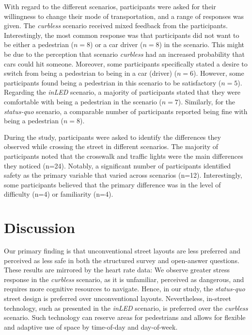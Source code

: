 With regard to the different scenarios, participants were asked for their willingness to change their mode of transportation, and a range of responses was given. 
The \emph{curbless} scenario received mixed feedback from the participants. Interestingly, the most common response was that participants did not want to be either a pedestrian ($n=8$) or a car driver ($n=8$) in the scenario. This might be due to the perception that scenario \emph{curbless} had an increased probability that cars could hit someone. Moreover, some participants specifically stated a desire to switch from being a pedestrian to being in a car (driver) ($n=6$). However, some participants found being a pedestrian in this scenario to be satisfactory ($n=5$).
Regarding the \emph{inLED} scenario, a majority of participants stated that they were comfortable with being a pedestrian in the scenario ($n=7$). Similarly, for the \emph{status-quo} scenario, a comparable number of participants reported being fine with being a pedestrian ($n=8$).

During the study, participants were asked to identify the differences they observed while crossing the street in different scenarios. The majority of participants noted that the crosswalk and traffic lights were the main differences they noticed (n=24). Notably, a significant number of participants identified safety as the primary variable that varied across scenarios (n=12). Interestingly, some participants believed that the primary difference was in the level of difficulty (n=4) or familiarity (n=4).


\section{Discussion}
Our primary finding is that unconventional street layouts are less preferred and perceived as less safe in both the structured survey and open-answer questions. These results are mirrored by the heart rate data: We observe greater stress response in the \emph{curbless} scenario, as it is unfamiliar, perceived as dangerous, and requires more cognitive resources to navigate. Hence, in our study, the \emph{status-quo} street design is preferred over unconventional layouts. Nevertheless, in-street technology, such as presented in the \emph{inLED} scenario, is preferred over the \emph{curbless} scenario. Such technology can reserve areas for pedestrians and allows for flexible and adaptive use of space by time-of-day and day-of-week.

